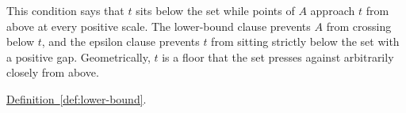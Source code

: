 \begin{remark*}[Interpretation]
This condition says that $t$ sits below the set while points of $A$ approach $t$ from above at every positive scale. The lower-bound clause prevents $A$ from crossing below $t$, and the epsilon clause prevents $t$ from sitting strictly below the set with a positive gap. Geometrically, $t$ is a floor that the set presses against arbitrarily closely from above.
\end{remark*}

\begin{dependencies}
\hyperref[def:lower-bound]{Definition~\ref*{def:lower-bound}}.
\end{dependencies}



